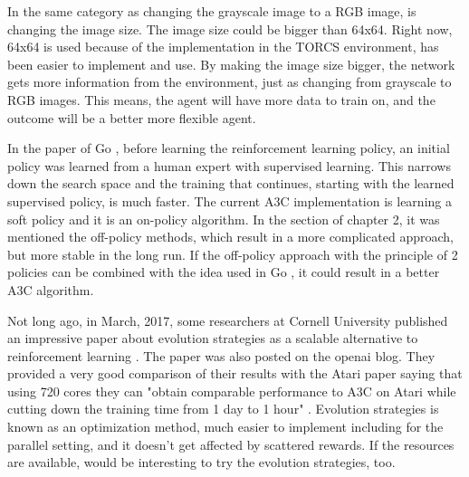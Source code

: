 In the same category as changing the grayscale image to a RGB image, is changing the image size. The image size could be bigger than 64x64. Right now, 64x64 is used because of the implementation in the TORCS environment, has been easier to implement and use. By making the image size bigger, the network gets more information from the environment, just as changing from grayscale to RGB images. This means, the agent will have more data to train on, and the outcome will be a better more flexible agent.

In the paper of Go \cite{Silver_2016}, before learning the reinforcement learning policy, an initial policy was learned from a human expert with supervised learning. This narrows down the search space and the training that continues, starting with the learned supervised policy, is much faster. The current A3C implementation is learning a soft policy and it is an on-policy algorithm. In the  section of chapter 2, it was mentioned the off-policy methods, which result in a more complicated approach, but more stable in the long run. If the off-policy approach with the principle of 2 policies can be combined with the idea used in Go \cite{Silver_2016}, it could result in a better A3C algorithm.

Not long ago, in March, 2017, some researchers at Cornell University published an impressive paper about evolution strategies as a scalable alternative to reinforcement learning \cite{EvolStrat}. The paper was also posted on the openai blog. They provided a very good comparison of their results with the Atari paper \cite{DBLP:journals/corr/MnihKSGAWR13} saying that using 720 cores they can "obtain comparable performance to A3C on Atari while cutting down the training time from 1 day to 1 hour" \cite{EvolStrat}. Evolution strategies is known as an optimization method, much easier to implement including for the parallel setting, and it doesn't get affected by scattered rewards. If the resources are available, would be interesting to try the evolution strategies, too.